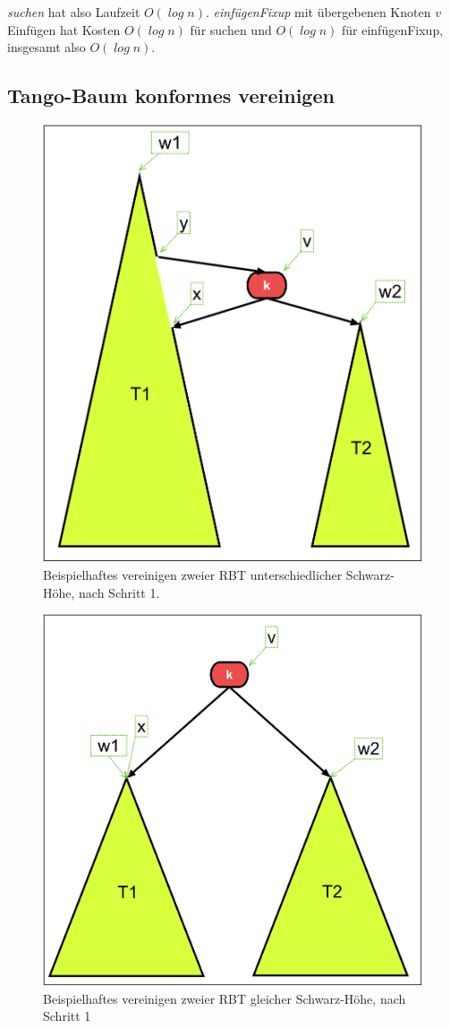 \documentclass[a4paper,12pt]{article}
\begin{document}
\noindent \textit{suchen} hat also Laufzeit $\mathit{O(\log {n})}$. \textit{einfügenFixup} mit übergebenen Knoten $v$ 
Einfügen hat  Kosten $\mathit{O(\log {n})}$ für suchen und  $\mathit{O(\log {n})}$ für einfügenFixup, insgesamt also  $\mathit{O(\log {n})}$. 


\subsection{Tango-Baum konformes vereinigen} \label{vereinigen}
\begin{figure}[h]
	\centering
	\includegraphics[height= 0.6\textwidth]{"Medien/RotSchwarzBaum/vereinigen"}
	\caption{Beispielhaftes vereinigen zweier RBT unterschiedlicher Schwarz-Höhe, nach Schritt 1. }
	\label{fig:vereinigen}
\end{figure}
\begin{figure}[h]
	\centering
	\includegraphics[height= 0.6\textwidth]{"Medien/RotSchwarzBaum/vereinigen2"}
	\caption{Beispielhaftes vereinigen zweier RBT gleicher Schwarz-Höhe, nach Schritt 1 }
	\label{fig:vereinigen2}
\end{figure}
\end{document}
